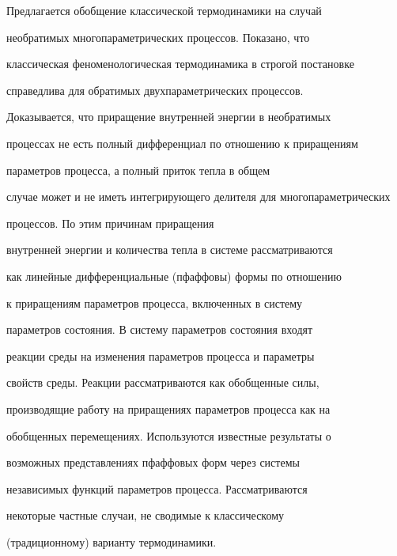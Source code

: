 \maketitle













Предлагается обобщение классической термодинамики на случай


необратимых многопараметрических процессов. Показано, что


классическая феноменологическая термодинамика в строгой постановке


справедлива для обратимых двухпараметрических процессов.


Доказывается, что приращение внутренней энергии в необратимых


процессах не есть полный дифференциал по отношению к приращениям


параметров процесса, а полный приток тепла в общем


случае может и не иметь интегрирующего делителя для многопараметрических


процессов. По этим причинам приращения


внутренней энергии и количества тепла в системе рассматриваются


как линейные дифференциальные (пфаффовы) формы по отношению


к приращениям параметров процесса, включенных в систему


параметров состояния. В систему параметров состояния входят


реакции среды на изменения параметров процесса и параметры


свойств среды. Реакции рассматриваются как обобщенные силы,


производящие работу на приращениях параметров процесса как на


обобщенных перемещениях. Используются известные результаты о


возможных представлениях пфаффовых форм через системы


независимых функций параметров процесса. Рассматриваются


некоторые частные случаи, не сводимые к классическому


(традиционному) варианту термодинамики.


\medskip





